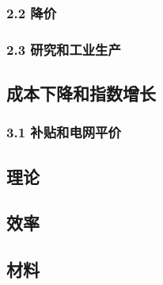 \subsubsection{2.2 降价}



\subsubsection{2.3 研究和工业生产}



\subsection{成本下降和指数增长}



\subsubsection{3.1 补贴和电网平价}



\subsection{理论}



\subsection{效率}



\subsection{材料}



